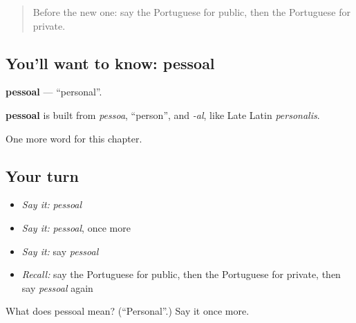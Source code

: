 \begin{quote}
Before the new one: say the Portuguese for public, then the Portuguese for private.
\end{quote}

\subsection*{You'll want to know: pessoal}
\textbf{pessoal} — \textquotedblleft{}personal\textquotedblright{}.

\begin{cousinweb}
\textbf{pessoal} is built from \emph{pessoa}, \textquotedblleft{}person\textquotedblright{}, and \emph{-al}, like Late Latin \emph{personalis}.
\end{cousinweb}

\begin{grammarlens}[title={What you've built}]
One more word for this chapter.
\end{grammarlens}

\subsection*{Your turn}
\begin{itemize}
\raggedright
  \item \emph{Say it:} \emph{pessoal}
  \item \emph{Say it:} \emph{pessoal}, once more
  \item \emph{Say it:} say \emph{pessoal}
  \item \emph{Recall:} say the Portuguese for public, then the Portuguese for private, then say \emph{pessoal} again
\end{itemize}

\begin{tcolorbox}[breakable,colback=teal!4,colframe=teal!35!black,title={Before you move on}]
What does pessoal mean? (\textquotedblleft{}Personal\textquotedblright{}.) Say it once more.
\end{tcolorbox}
